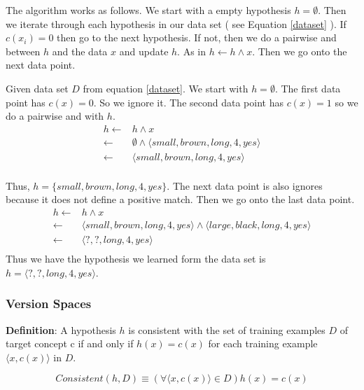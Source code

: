 \documentclass[10pt,a4paper]{article}
\begin{document}
The algorithm works as follows. We start with a empty hypothesis $h = \emptyset$. Then we iterate through each hypothesis in our data set ( see Equation \ref{dataset} ). If $c(x_i) = 0 $ then go to the next hypothesis. If not, then we do a pairwise and between $h$ and the data $x$ and update $h$. As in $h \leftarrow h \wedge x$. Then we go onto the next data point.

Given data set $D$ from equation \ref{dataset}. We start with $h = \emptyset$. The first data point has $c(x) = 0$. So we ignore it. The second data point has $c(x) = 1$ so we do a pairwise and with $h$.
\begin{equation}
\begin{split}
h \leftarrow & h \wedge x \\
  \leftarrow & \emptyset \wedge \langle small,brown,long,4,yes\rangle \\
  \leftarrow & \langle small,brown,long,4,yes\rangle \\
\end{split}
\end{equation}

Thus, $h =  \{small,brown,long,4,yes\}$.
The next data point is also ignores because it does not define a positive match. Then we go onto the last data point.
\begin{equation}
\begin{split}
h \leftarrow & h \wedge x \\
  \leftarrow & \langle small,brown,long,4,yes\rangle \wedge \langle large,black,long,4,yes\rangle \\
  \leftarrow & \langle ?,?,long,4,yes\rangle \\
\end{split}
\end{equation}
Thus we have the hypothesis we learned form the data set is $h =\langle?,?,long,4,yes\rangle$. 

\citep{stan}

\subsubsection{Version Spaces}
\textbf{Definition}: A hypothesis $h$ is consistent with the set of training examples $D$ of target concept c if and only if $h(x) = c(x)$ for each training example $\langle x,c(x) \rangle$ in $D$.

\begin{equation}
Consistent(h,D)\equiv ( \forall \langle x,c(x) \rangle \in D) h(x) = c(x)
\end{equation}
\end{document}
